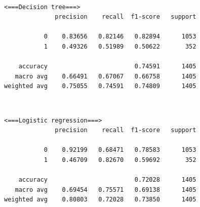 \documentclass[11pt]{article}
\makeatletter
\newcommand{\boxspacing}{\kern\kvtcb@left@rule\kern\kvtcb@boxsep}
\newcommand{\prompt}[4]{
        {\ttfamily\llap{{\color{#2}[#3]:\hspace{3pt}#4}}\vspace{-\baselineskip}}
    }
\makeatother
\begin{document}
    \begin{center}
    \end{center}
    { \hspace*{\fill} \\}
    
    \begin{Verbatim}[commandchars=\\\{\}]
 <===Decision tree===>
              precision    recall  f1-score   support

           0    0.83656   0.82146   0.82894      1053
           1    0.49326   0.51989   0.50622       352

    accuracy                        0.74591      1405
   macro avg    0.66491   0.67067   0.66758      1405
weighted avg    0.75055   0.74591   0.74809      1405

    \end{Verbatim}

    \begin{center}
    \end{center}
    { \hspace*{\fill} \\}
    
    \begin{Verbatim}[commandchars=\\\{\}]
 <===Logistic regression===>
              precision    recall  f1-score   support

           0    0.92199   0.68471   0.78583      1053
           1    0.46709   0.82670   0.59692       352

    accuracy                        0.72028      1405
   macro avg    0.69454   0.75571   0.69138      1405
weighted avg    0.80803   0.72028   0.73850      1405

    \end{Verbatim}

    \begin{center}
    \end{center}
    { \hspace*{\fill} \\}
    
    \begin{tcolorbox}[breakable, size=fbox, boxrule=1pt, pad at break*=1mm,colback=cellbackground, colframe=cellborder]
\prompt{In}{incolor}{ }{\boxspacing}
\begin{Verbatim}[commandchars=\\\{\}]

\end{Verbatim}
\end{tcolorbox}
\end{document}
